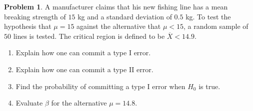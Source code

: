 \documentclass[11pt,a4paper]{article}
\theoremstyle{definition}
\newtheorem{problemx}{Problem}[section]
\newenvironment{problem}{\begin{problemx}}{\end{problemx}}
\begin{document}
\begin{problem}
A manufacturer claims that his new fishing line has a mean breaking strength of $15$ kg and
a standard deviation of $0.5$ kg. To test the hypothesis that $\mu=15$ against the
alternative that $\mu<15$, a random sample of $50$ lines is tested. The critical region is
defined to be $\overline{X}<14.9$.
\begin{enumerate}
\item[(a).] Explain how one can commit a type I error.
\item[(b).] Explain how one can commit a type II error.
\item[(c).] Find the probability of committing a type I error when $H_0$ is true.
\item[(d).] Evaluate $\beta$ for the alternative $\mu=14.8$.
\end{enumerate}
\end{problem}
\end{document}
